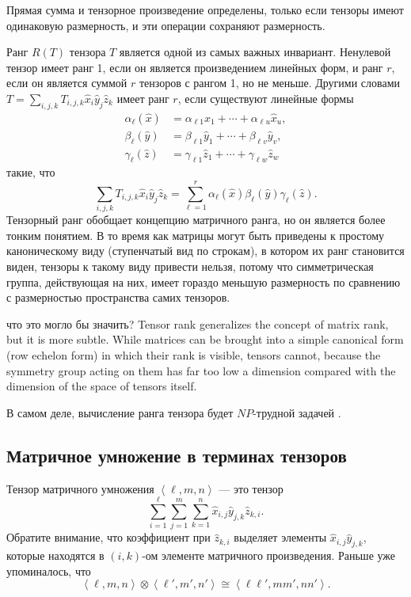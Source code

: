 Прямая сумма и тензорное произведение определены, только если тензоры имеют одинаковую размерность, и эти операции сохраняют размерность.

Ранг $R(T)$ тензора $T$ является одной из самых важных инвариант. Ненулевой тензор имеет ранг 1, если он является произведением линейных форм, и ранг $r$, если он является суммой $r$ тензоров с рангом 1, но не меньше. Другими словами $T = \sum_{i,j,k} T_{i,j,k} \widehat{x}_i \widehat{y}_j \widehat{z}_k$ имеет ранг $r$, если существуют линейные формы 
\begin{align*}
     \alpha_\ell(\widehat{x}) & = \alpha_{\ell 1} \widehat{x}_1 + \dotsb + \alpha_{\ell u} \widehat{x}_u,\\
     \beta_\ell(\widehat{y}) & = \beta_{\ell 1} \widehat{y}_1 + \dotsb + \beta_{\ell v} \widehat{y}_v,\\
     \gamma_\ell(\widehat{z}) & = \gamma_{\ell 1} \widehat{z}_1 + \dotsb + \gamma_{\ell w} \widehat{z}_w
\end{align*}
такие, что
\[
	\sum_{i,j,k} T_{i,j,k} \widehat{x}_i \widehat{y}_j \widehat{z}_k = \sum_{\ell=1}^r \alpha_\ell(\widehat{x}) \beta_\ell(\widehat{y}) \gamma_\ell(\widehat{z}).
\]
Тензорный ранг обобщает концепцию матричного ранга, но он является более тонким понятием. В то время как матрицы могут быть приведены к простому каноническому виду (ступенчатый вид по строкам), в котором их ранг становится виден, тензоры к такому виду привести нельзя, потому что симметрическая группа, действующая на них, имеет гораздо меньшую размерность по сравнению с размерностью пространства самих тензоров. 
\begin{question}
  что это могло бы значить? Tensor rank generalizes the concept of matrix rank, but it is more subtle. While matrices can be brought
into a simple canonical form (row echelon form) in which their rank is visible, tensors cannot, because the
symmetry group acting on them has far too low a dimension compared with the dimension of the space of
tensors itself.
\end{question}
В самом деле, вычисление ранга тензора будет $NP$-трудной задачей \cite{Hastad90}.

\subsection{Матричное умножение в терминах тензоров}

Тензор матричного умножения $\left\langle \ell,m,n \right\rangle$ --- это тензор 
\[
	\sum_{i=1}^{\ell} \sum_{j=1}^{m} \sum_{k=1}^{n} \widehat{x}_{i,j} \widehat{y}_{j,k} \widehat{z}_{k,i}.
\]
Обратите внимание, что коэффициент при $\widehat{z}_{k,i}$ выделяет элементы $\widehat{x}_{i,j} \widehat{y}_{j,k}$, которые находятся в $(i,k)$-ом элементе матричного произведения. Раньше уже упоминалось, что 
\[
	\left\langle \ell,m,n \right\rangle \otimes \left\langle \ell',m',n' \right\rangle \cong \left\langle \ell \ell', m m', n n' \right\rangle.
\]

